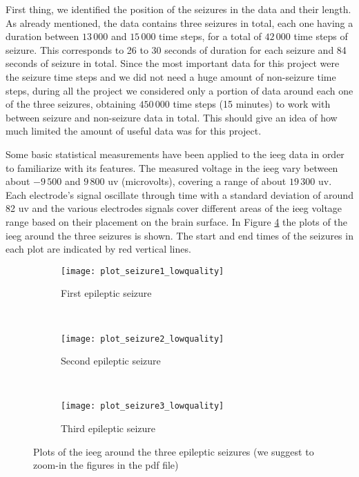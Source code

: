 First thing, we identified the position of the seizures in the data and their length. As already mentioned, the data contains three seizures in total, each one having a duration between $13\,000$ and $15\,000$ time steps, for a total of $42\,000$ time steps of seizure. This corresponds to 26 to 30 seconds of duration for each seizure and 84 seconds of seizure in total. Since the most important data for this project were the seizure time steps and we did not need a huge amount of non-seizure time steps, during all the project we considered only a portion of data around each one of the three seizures, obtaining $450\,000$ time steps (15 minutes) to work with between seizure and non-seizure data in total. This should give an idea of how much limited the amount of useful data was for this project.

Some basic statistical measurements have been applied to the \acs{ieeg} data in order to familiarize with its features. The measured voltage in the \acs{ieeg} vary between about $-9\,500$ and $9\,800$ \acs{uv} (microvolts), covering a range of about $19\,300$ \acs{uv}. Each electrode's signal oscillate through time with a standard deviation of around 82 \acs{uv} and the various electrodes signals cover different areas of the \acs{ieeg} voltage range based on their placement on the brain surface. In Figure \ref{fig:plot_seizures} the plots of the \acs{ieeg} around the three seizures is shown. The start and end times of the seizures in each plot are indicated by red vertical lines.
\newpage
\begin{figure}[H]
    \centering
    \begin{subfigure}[t]{0.7\textwidth}
		\texttt{[image: plot\_seizure1\_lowquality]}
        \caption{First epileptic seizure}
        \label{fig:plot_seizure1}
	\end{subfigure}
	~
	\begin{subfigure}[t]{0.7\textwidth}
		\texttt{[image: plot\_seizure2\_lowquality]}
        \caption{Second epileptic seizure}
        \label{fig:plot_seizure2}
    \end{subfigure}
    ~
    \begin{subfigure}[t]{0.7\textwidth}
		\texttt{[image: plot\_seizure3\_lowquality]}
        \caption{Third epileptic seizure}
        \label{fig:plot_seizure3}
	\end{subfigure}
    \caption{Plots of the \acs{ieeg} around the three epileptic seizures (we suggest to zoom-in the figures in the pdf file)}
    \label{fig:plot_seizures}
\end{figure}
